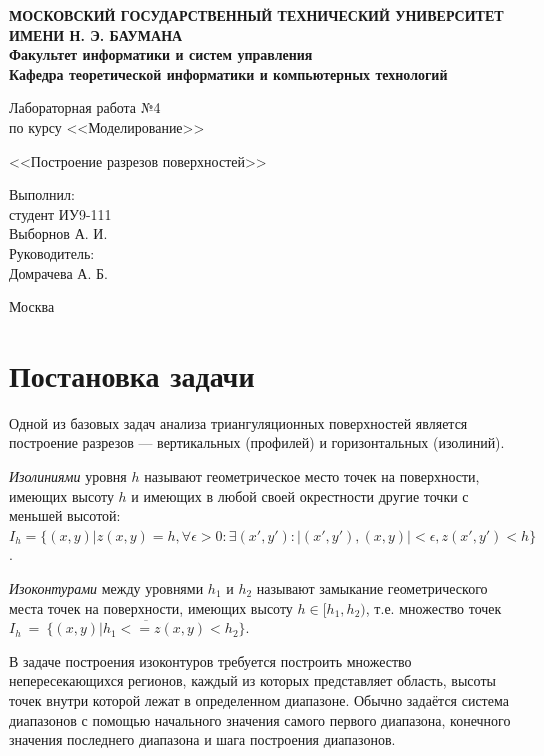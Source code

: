 \documentclass[12pt,a4paper,oneside]{extarticle}
\begin{document}
\pgfplotsset{compat=1.8}

\thispagestyle{empty}
\newpage
{
\centering


\textbf{
МОСКОВСКИЙ ГОСУДАРСТВЕННЫЙ ТЕХНИЧЕСКИЙ УНИВЕРСИТЕТ ИМЕНИ Н. Э. БАУМАНА \\
Факультет информатики и систем управления \\
Кафедра теоретической информатики и компьютерных технологий}
\bigskip
\bigskip
\bigskip
\bigskip
\bigskip
\bigskip
\bigskip

\vfill


Лабораторная работа №4 \\
по курсу <<Моделирование>>

\bigskip

{\large <<Построение разрезов поверхностей>>}
\bigskip

\vfill



\hfill\parbox{4cm} {
Выполнил:\\
студент ИУ9-111 \hfill \\
Выборнов А. И.\hfill \medskip\\
Руководитель:\\
Домрачева А. Б.\hfill
}


\vspace{\fill}

Москва \number\year
\clearpage
}



\clearpage


\section{Постановка задачи}
    Одной из базовых задач анализа триангуляционных поверхностей является построение разрезов --- вертикальных (профилей) и горизонтальных (изолиний).

    {\it Изолиниями} уровня $h$ называют геометрическое место точек на поверхности, имеющих высоту $h$ и имеющих в любой своей окрестности другие точки с меньшей высотой:
    $I_h = \{(x,y) | z(x,y)=h, \forall \epsilon > 0 \colon \exists (x',y') \colon |(x',y'),(x,y)|<\epsilon, z(x',y')<h \}$.

    {\it Изоконтурами} между уровнями $h_1$ и $h_2$ называют замыкание геометрического места точек на поверхности, имеющих высоту $h \in [h_1, h_2)$, т.е. множество точек $I_h~=~\overline{\{ (x, y) | h_1 <= z(x,y) < h_2 \}}$.

    В задаче построения изоконтуров требуется построить множество непересекающихся регионов, каждый из которых представляет область, высоты точек внутри которой лежат в определенном диапазоне. Обычно задаётся система диапазонов с помощью начального значения самого первого диапазона, конечного значения последнего диапазона и шага построения диапазонов.
\end{document}
